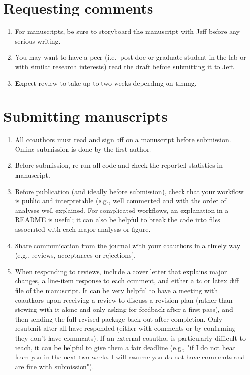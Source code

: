 \documentclass[12pt]{article}
\begin{document}
\section{Requesting comments}
\begin{enumerate}
\item For manuscripts, be sure to storyboard the manuscript with Jeff before any serious writing.
\item You may want to have a peer (i.e., post-doc or graduate student in the lab or with similar research interests) read the draft before submitting it to Jeff.
\item \textbf Expect review to take up to two weeks depending on timing.
\end{enumerate}

\section{Submitting manuscripts}
\begin{enumerate}
\item All coauthors must read and sign off on a manuscript before
  submission. Online submission is done by the first author.
\item Before submission, re run all code and check the reported statistics in
  manuscript.
\item Before publication (and ideally before submission), check that your workflow is public and interpretable (e.g., well commented and with the order of analyses well explained. For complicated workflows, an explanation in a README is useful; it can also be helpful to break the code into files associated with each major analysis or figure.
\item Share communication from the journal with your coauthors in a timely way (e.g., reviews, acceptances or rejections).
\item When responding to reviews, include a cover letter that explains major changes, a line-item response to each comment, and either a tc or latex diff file of the manuscript. It can be very helpful to have a meeting with coauthors upon receiving a review to discuss a revision plan (rather than stewing with it alone and only asking for feedback after a first pass), and then sending the full revised package back out after completion. Only resubmit after all have responded (either with comments or by confirming they don't have comments). If an external coauthor is particularly difficult to reach, it can be helpful to give them a fair deadline (e.g., "if I do not hear from you in the next two weeks I will assume you do not have comments and are fine with submission").
\end{enumerate}
\end{document}
